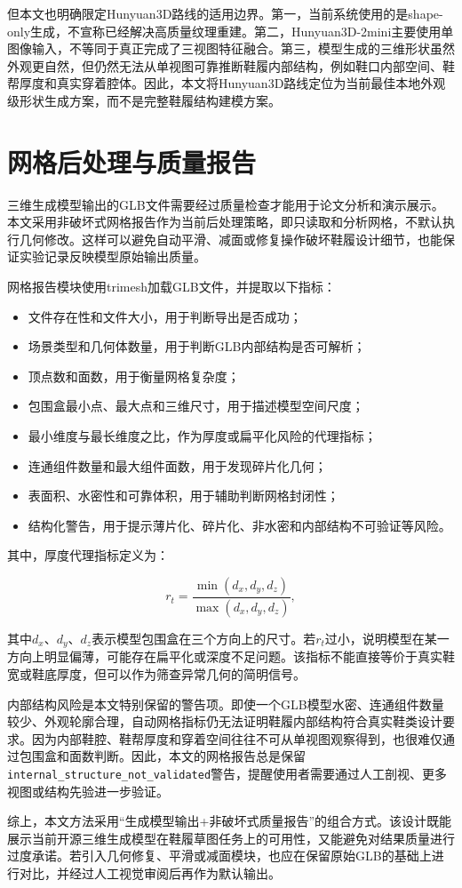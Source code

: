 但本文也明确限定Hunyuan3D路线的适用边界。第一，当前系统使用的是shape-only生成，不宣称已经解决高质量纹理重建。第二，Hunyuan3D-2mini主要使用单图像输入，不等同于真正完成了三视图特征融合。第三，模型生成的三维形状虽然外观更自然，但仍然无法从单视图可靠推断鞋履内部结构，例如鞋口内部空间、鞋帮厚度和真实穿着腔体。因此，本文将Hunyuan3D路线定位为当前最佳本地外观级形状生成方案，而不是完整鞋履结构建模方案。

\section{网格后处理与质量报告}

三维生成模型输出的GLB文件需要经过质量检查才能用于论文分析和演示展示。本文采用非破坏式网格报告作为当前后处理策略，即只读取和分析网格，不默认执行几何修改。这样可以避免自动平滑、减面或修复操作破坏鞋履设计细节，也能保证实验记录反映模型原始输出质量。

网格报告模块使用trimesh加载GLB文件，并提取以下指标：

\begin{itemize}
  \item 文件存在性和文件大小，用于判断导出是否成功；
  \item 场景类型和几何体数量，用于判断GLB内部结构是否可解析；
  \item 顶点数和面数，用于衡量网格复杂度；
  \item 包围盒最小点、最大点和三维尺寸，用于描述模型空间尺度；
  \item 最小维度与最长维度之比，作为厚度或扁平化风险的代理指标；
  \item 连通组件数量和最大组件面数，用于发现碎片化几何；
  \item 表面积、水密性和可靠体积，用于辅助判断网格封闭性；
  \item 结构化警告，用于提示薄片化、碎片化、非水密和内部结构不可验证等风险。
\end{itemize}

其中，厚度代理指标定义为：

\begin{equation}
  r_t = \frac{\min(d_x, d_y, d_z)}{\max(d_x, d_y, d_z)},
\end{equation}

其中$d_x$、$d_y$、$d_z$表示模型包围盒在三个方向上的尺寸。若$r_t$过小，说明模型在某一方向上明显偏薄，可能存在扁平化或深度不足问题。该指标不能直接等价于真实鞋宽或鞋底厚度，但可以作为筛查异常几何的简明信号。

内部结构风险是本文特别保留的警告项。即使一个GLB模型水密、连通组件数量较少、外观轮廓合理，自动网格指标仍无法证明鞋履内部结构符合真实鞋类设计要求。因为内部鞋腔、鞋帮厚度和穿着空间往往不可从单视图观察得到，也很难仅通过包围盒和面数判断。因此，本文的网格报告总是保留\texttt{internal\_structure\_not\_validated}警告，提醒使用者需要通过人工剖视、更多视图或结构先验进一步验证。

综上，本文方法采用“生成模型输出+非破坏式质量报告”的组合方式。该设计既能展示当前开源三维生成模型在鞋履草图任务上的可用性，又能避免对结果质量进行过度承诺。若引入几何修复、平滑或减面模块，也应在保留原始GLB的基础上进行对比，并经过人工视觉审阅后再作为默认输出。
